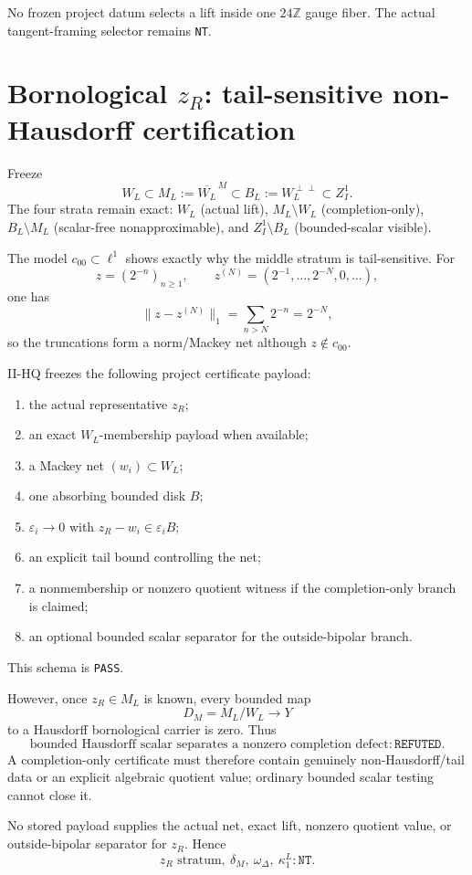 \documentclass[10pt,a4paper]{article}
\newcommand{\PASS}{\texttt{PASS}}
\newcommand{\NT}{\texttt{NT}}
\newcommand{\REF}{\texttt{REFUTED}}
\newcommand{\Z}{\mathbb Z}
\newcommand{\clM}[1]{\overline{#1}^{\,M}}
\begin{document}
No frozen project datum selects a lift inside one $24\Z$ gauge fiber.  The actual tangent-framing selector remains \NT.

\section{\texorpdfstring{Bornological $z_R$: tail-sensitive non-Hausdorff certification}{Bornological zR: tail-sensitive non-Hausdorff certification}}
Freeze
\[
W_L\subset M_L:=\clM{W_L}\subset B_L:=W_L^{\perp\perp}\subset Z_I^1.
\tag{9}
\]
The four strata remain exact: $W_L$ (actual lift), $M_L\setminus W_L$ (completion-only), $B_L\setminus M_L$ (scalar-free nonapproximable), and $Z_I^1\setminus B_L$ (bounded-scalar visible).

The model $c_{00}\subset\ell^1$ shows exactly why the middle stratum is tail-sensitive.  For
\[
z=(2^{-n})_{n\ge1},\qquad z^{(N)}=(2^{-1},\ldots,2^{-N},0,\ldots),
\]
one has
\[
\|z-z^{(N)}\|_1=\sum_{n>N}2^{-n}=2^{-N},
\tag{10}
\]
so the truncations form a norm/Mackey net although $z\notin c_{00}$.

II-HQ freezes the following project certificate payload:
\begin{enumerate}
\item the actual representative $z_R$;
\item an exact $W_L$-membership payload when available;
\item a Mackey net $(w_i)\subset W_L$;
\item one absorbing bounded disk $B$;
\item $\varepsilon_i\to0$ with $z_R-w_i\in\varepsilon_iB$;
\item an explicit tail bound controlling the net;
\item a nonmembership or nonzero quotient witness if the completion-only branch is claimed;
\item an optional bounded scalar separator for the outside-bipolar branch.
\end{enumerate}
This schema is \PASS.

However, once $z_R\in M_L$ is known, every bounded map
\[
D_M=M_L/W_L\longrightarrow Y
\]
to a Hausdorff bornological carrier is zero.  Thus
\[
\boxed{
\text{bounded Hausdorff scalar separates a nonzero completion defect}:\REF.
}
\tag{11}
\]
A completion-only certificate must therefore contain genuinely non-Hausdorff/tail data or an explicit algebraic quotient value; ordinary bounded scalar testing cannot close it.

No stored payload supplies the actual net, exact lift, nonzero quotient value, or outside-bipolar separator for $z_R$.  Hence
\[
\boxed{z_R\text{ stratum},\ \delta_M,\ \omega_\Delta,\ \kappa_1^L:\NT.}
\tag{12}
\]
\end{document}

